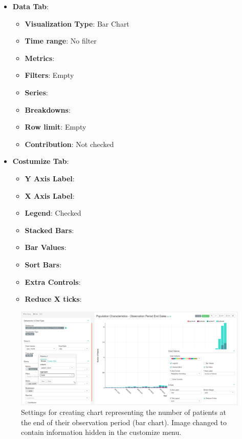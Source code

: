 \documentclass[]{book}
\providecommand{\tightlist}{%
  \setlength{\itemsep}{0pt}\setlength{\parskip}{0pt}}
\begin{document}
\begin{itemize}
\tightlist
\item
  \textbf{Data Tab}:

  \begin{itemize}
  \tightlist
  \item
    \textbf{Visualization Type}: Bar Chart
  \item
    \textbf{Time range}: No filter
  \item
    \textbf{Metrics}:
  \item
    \textbf{Filters}: Empty
  \item
    \textbf{Series}:
  \item
    \textbf{Breakdowns}:
  \item
    \textbf{Row limit}: Empty
  \item
    \textbf{Contribution}: Not checked
  \end{itemize}
\item
  \textbf{Costumize Tab}:

  \begin{itemize}
  \tightlist
  \item
    \textbf{Y Axis Label}:
  \item
    \textbf{X Axis Label}:
  \item
    \textbf{Legend}: Checked
  \item
    \textbf{Stacked Bars}:
  \item
    \textbf{Bar Values}:
  \item
    \textbf{Sort Bars}:
  \item
    \textbf{Extra Controls}:
  \item
    \textbf{Reduce X ticks}:
  \end{itemize}
\end{itemize}

\begin{figure}
\includegraphics[width=1\linewidth]{images/populationCharacteristicsObservationPeriodEndDates} \caption{Settings for creating chart representing the number of patients at the end of their observation period (bar chart). Image changed to contain information hidden in the customize menu.}\label{fig:populationCharacteristicsObservationPeriodEndDates}
\end{figure}
\end{document}
